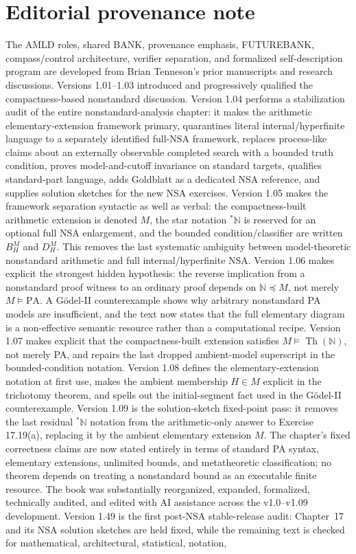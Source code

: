 \documentclass[11pt,openany]{book}
\theoremstyle{definition}
\theoremstyle{remark}
\newcommand{\N}{\mathbb{N}}
\begin{document}
\chapter*{Editorial provenance note}
The AMLD roles, shared BANK, provenance emphasis, FUTUREBANK, compass/control architecture, verifier separation, and formalized self-description program are developed from Brian Tenneson's prior manuscripts and research discussions. Versions 1.01--1.03 introduced and progressively qualified the compactness-based nonstandard discussion. Version 1.04 performs a stabilization audit of the entire nonstandard-analysis chapter: it makes the arithmetic elementary-extension framework primary, quarantines literal internal/hyperfinite language to a separately identified full-NSA framework, replaces process-like claims about an externally observable completed search with a bounded truth condition, proves model-and-cutoff invariance on standard targets, qualifies standard-part language, adds Goldblatt as a dedicated NSA reference, and supplies solution sketches for the new NSA exercises. Version 1.05 makes the framework separation syntactic as well as verbal: the compactness-built arithmetic extension is denoted $M$, the star notation ${}^*\N$ is reserved for an optional full NSA enlargement, and the bounded condition/classifier are written $B_H^M$ and $D_H^M$. This removes the last systematic ambiguity between model-theoretic nonstandard arithmetic and full internal/hyperfinite NSA. Version 1.06 makes explicit the strongest hidden hypothesis: the reverse implication from a nonstandard proof witness to an ordinary proof depends on $\N\preccurlyeq M$, not merely $M\models\mathrm{PA}$. A G\"odel-II counterexample shows why arbitrary nonstandard PA models are insufficient, and the text now states that the full elementary diagram is a non-effective semantic resource rather than a computational recipe. Version 1.07 makes explicit that the compactness-built extension satisfies $M\models\operatorname{Th}(\N)$, not merely PA, and repairs the last dropped ambient-model superscript in the bounded-condition notation. Version 1.08 defines the elementary-extension notation at first use, makes the ambient membership $H\in M$ explicit in the trichotomy theorem, and spells out the initial-segment fact used in the G\"odel-II counterexample. Version 1.09 is the solution-sketch fixed-point pass: it removes the last residual ${}^*\N$ notation from the arithmetic-only answer to Exercise 17.19(a), replacing it by the ambient elementary extension $M$. The chapter's fixed correctness claims are now stated entirely in terms of standard PA syntax, elementary extensions, unlimited bounds, and metatheoretic classification; no theorem depends on treating a nonstandard bound as an executable finite resource. The book was substantially reorganized, expanded, formalized, technically audited, and edited with AI assistance across the v1.0--v1.09 development. Version 1.49 is the first post-NSA stable-release audit: Chapter~17 and its NSA solution sketches are held fixed, while the remaining text is checked for mathematical, architectural, statistical, notation, 
\end{document}

